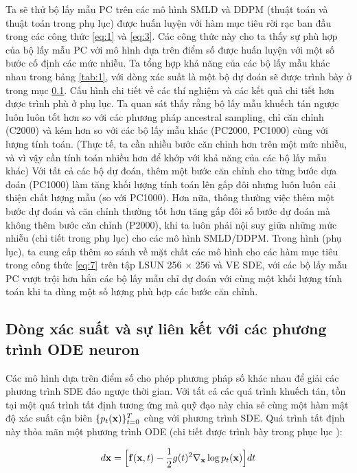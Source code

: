 \documentclass{article} %
\begin{document}
Ta sẽ thử bộ lấy mẫu PC trên các mô hình SMLD và DDPM (thuật toán và thuật toán trong phụ lục) được huấn luyện với hàm mục tiêu rời rạc ban đầu trong các công thức \ref{eq:1} và \ref{eq:3}.
Các công thức này cho ta thấy sự phù hợp của bộ lấy mẫu PC với mô hình dựa trên điểm số được huấn luyện với một số bước cố định các mức nhiễu.
Ta tổng hợp khả năng của các bộ lấy mẫu khác nhau trong bảng \ref{tab:1}, với dòng xác suất là một bộ dự đoán sẽ được trình bày ở trong mục \ref{Probability-Flow-and-Connection-to-Neural-ODEs}.
Cấu hình chi tiết về các thí nghiệm và các kết quả chi tiết hơn được trình phù ở phụ lục.
Ta quan sát thấy rằng bộ lấy mẫu khuếch tán ngược luôn luôn tốt hơn so với các phương pháp ancestral sampling, chỉ căn chỉnh (C2000) và kém hơn so với các bộ lấy mẫu khác (PC2000, PC1000) cùng với lượng tính toán.
(Thực tế, ta cần nhiều bước căn chỉnh hơn trên một mức nhiễu, và vì vậy cần tính toán nhiều hơn để khớp với khả năng của các bộ lấy mẫu khác)
Với tất cả các bộ dự đoán, thêm một bước căn chỉnh cho từng bước dựa đoán (PC1000) làm tăng khối lượng tính toán lên gấp đôi nhưng luôn luôn cải thiện chất lượng mẫu (so với PC1000).
Hơn nữa, thông thường việc thêm một bước dự đoán và căn chỉnh thường tốt hơn tăng gấp đôi số bước dự đoán mà không thêm bước căn chỉnh (P2000),
khi ta luôn phải nội suy giữa những mức nhiễu (chi tiết trong phụ lục) cho các mô hình SMLD/DDPM.
Trong hình (phụ lục), ta cung cấp thêm so sánh về mặt chất các mô hình cho các hàm mục tiêu trong công thức \ref{eq:7} trên tập LSUN 256 $\times$ 256 và VE SDE, với các bộ lấy mẫu PC vượt trội hơn hẳn các bộ lấy mẫu chỉ dự đoán với cùng một khối lượng tính toán khi ta dùng một số lượng phù hợp các bước căn chỉnh.

\subsection{Dòng xác suất và sự liên kết với các phương trình ODE neuron} \label{Probability-Flow-and-Connection-to-Neural-ODEs}

Các mô hình dựa trên điểm số cho phép phương pháp số khác nhau để giải các phương trình SDE đảo ngược thời gian.
Với tất cả các quá trình khuếch tán, tồn tại một quá trình tất định tương ứng mà quỹ đạo này chia sẻ cùng một hàm mật độ xác suất cận biên $\lbrace p_t (\bold{x}) \rbrace_{t=0}^T$ cùng với phương trình SDE.
Quá trình tất định này thỏa mãn một phương trình ODE (chi tiết được trình bày trong phục lục ):

\begin{equation} \label{eq:13}
    d \bold{x} = \Big \lbrack \bold{f}(\bold{x}, t) - \dfrac{1}{2}g(t)^2 \nabla_{\bold{x}} \log p_t (\bold{x}) \Big \rbrack dt
\end{equation}
\end{document}
